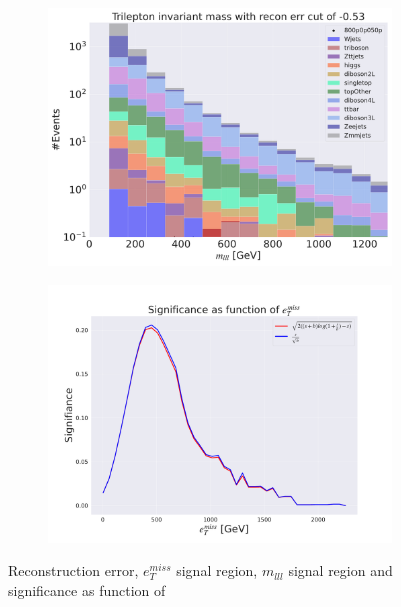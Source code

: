 \begin{figure}[H]
    \hfill
    \begin{subfigure}{.40\textwidth}
        \includegraphics[width=\textwidth]{Figures/VAE_testing/big/3lep/b_data_recon_big_rm3_feats_sig_800p0p050p_mlll_recon_errcut_-0.53.pdf}
        \caption{}
        \label{fig:VAE_3lep_big_mlll_800_3}
    \end{subfigure}
    \hfill   
    \begin{subfigure}{.40\textwidth}
        \includegraphics[width=\textwidth]{Figures/VAE_testing/big/3lep/significance_etmiss_800p0p050p_-0.529426176908041.pdf}
        \caption{}
        \label{fig:VAE_3lep_big_signi_800_3}
    \end{subfigure}
    \hfill      
    \caption[3lep deep network | $800p50$ | VAE | 3]{Reconstruction error, $e_T^{miss}$ signal region, $m_{lll}$ signal region and significance as function of 
}
\end{figure}
